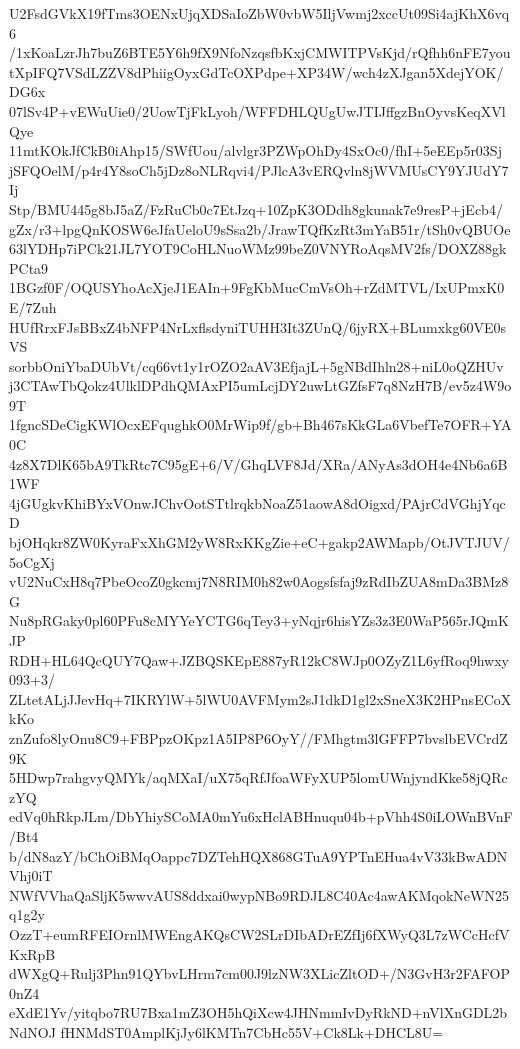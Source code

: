 U2FsdGVkX19fTms3OENxUjqXDSaIoZbW0vbW5IljVwmj2xccUt09Si4ajKhX6vq6
/1xKoaLzrJh7buZ6BTE5Y6h9fX9NfoNzqsfbKxjCMWITPVsKjd/rQfhh6nFE7you
tXpIFQ7VSdLZZV8dPhiigOyxGdTcOXPdpe+XP34W/wch4zXJgan5XdejYOK/DG6x
07lSv4P+vEWuUie0/2UowTjFkLyoh/WFFDHLQUgUwJTIJffgzBnOyvsKeqXVlQye
11mtKOkJfCkB0iAhp15/SWfUou/alvlgr3PZWpOhDy4SxOc0/fhI+5eEEp5r03Sj
jSFQOelM/p4r4Y8soCh5jDz8oNLRqvi4/PJlcA3vERQvln8jWVMUsCY9YJUdY7Ij
Stp/BMU445g8bJ5aZ/FzRuCb0c7EtJzq+10ZpK3ODdh8gkunak7e9resP+jEcb4/
gZx/r3+lpgQnKOSW6eJfaUeloU9sSsa2b/JrawTQfKzRt3mYaB51r/tSh0vQBUOe
63lYDHp7iPCk21JL7YOT9CoHLNuoWMz99beZ0VNYRoAqsMV2fs/DOXZ88gkPCta9
1BGzf0F/OQUSYhoAcXjeJ1EAIn+9FgKbMucCmVsOh+rZdMTVL/IxUPmxK0E/7Zuh
HUfRrxFJsBBxZ4bNFP4NrLxflsdyniTUHH3It3ZUnQ/6jyRX+BLumxkg60VE0sVS
sorbbOniYbaDUbVt/cq66vt1y1rOZO2aAV3EfjajL+5gNBdIhln28+niL0oQZHUv
j3CTAwTbQokz4UlklDPdhQMAxPI5umLcjDY2uwLtGZfsF7q8NzH7B/ev5z4W9o9T
1fgncSDeCigKWlOcxEFqughkO0MrWip9f/gb+Bh467sKkGLa6VbefTe7OFR+YA0C
4z8X7DlK65bA9TkRtc7C95gE+6/V/GhqLVF8Jd/XRa/ANyAs3dOH4e4Nb6a6B1WF
4jGUgkvKhiBYxVOnwJChvOotSTtlrqkbNoaZ51aowA8dOigxd/PAjrCdVGhjYqcD
bjOHqkr8ZW0KyraFxXhGM2yW8RxKKgZie+eC+gakp2AWMapb/OtJVTJUV/5oCgXj
vU2NuCxH8q7PbeOcoZ0gkcmj7N8RIM0h82w0Aogsfsfaj9zRdIbZUA8mDa3BMz8G
Nu8pRGaky0pl60PFu8cMYYeYCTG6qTey3+yNqjr6hisYZs3z3E0WaP565rJQmKJP
RDH+HL64QcQUY7Qaw+JZBQSKEpE887yR12kC8WJp0OZyZ1L6yfRoq9hwxy093+3/
ZLtetALjJJevHq+7IKRYlW+5lWU0AVFMym2sJ1dkD1gl2xSneX3K2HPnsECoXkKo
znZufo8lyOnu8C9+FBPpzOKpz1A5IP8P6OyY//FMhgtm3lGFFP7bvslbEVCrdZ9K
5HDwp7rahgvyQMYk/aqMXaI/uX75qRfJfoaWFyXUP5lomUWnjyndKke58jQRczYQ
edVq0hRkpJLm/DbYhiySCoMA0mYu6xHclABHnuqu04b+pVhh4S0iLOWnBVnF/Bt4
b/dN8azY/bChOiBMqOappc7DZTehHQX868GTuA9YPTnEHua4vV33kBwADNVhj0iT
NWfVVhaQaSljK5wwvAUS8ddxai0wypNBo9RDJL8C40Ac4awAKMqokNeWN25q1g2y
OzzT+eumRFEIOrnlMWEngAKQsCW2SLrDIbADrEZfIj6fXWyQ3L7zWCcHcfVKxRpB
dWXgQ+Rulj3Phn91QYbvLHrm7cm00J9lzNW3XLicZltOD+/N3GvH3r2FAFOP0nZ4
eXdE1Yv/yitqbo7RU7Bxa1mZ3OH5hQiXcw4JHNmmIvDyRkND+nVlXnGDL2bNdNOJ
fHNMdST0AmplKjJy6lKMTn7CbHc55V+Ck8Lk+DHCL8U=

